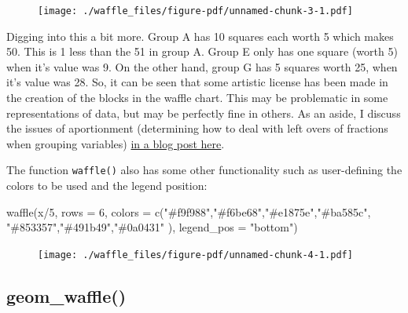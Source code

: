 \documentclass[
  letterpaper,
  DIV=11,
  numbers=noendperiod]{scrreprt}
\newenvironment{Shaded}{\begin{snugshade}}{\end{snugshade}}
\newcommand{\AttributeTok}[1]{\textcolor[rgb]{0.40,0.45,0.13}{#1}}
\newcommand{\DecValTok}[1]{\textcolor[rgb]{0.68,0.00,0.00}{#1}}
\newcommand{\FunctionTok}[1]{\textcolor[rgb]{0.28,0.35,0.67}{#1}}
\newcommand{\NormalTok}[1]{\textcolor[rgb]{0.00,0.23,0.31}{#1}}
\newcommand{\SpecialCharTok}[1]{\textcolor[rgb]{0.37,0.37,0.37}{#1}}
\newcommand{\StringTok}[1]{\textcolor[rgb]{0.13,0.47,0.30}{#1}}
\begin{document}
\begin{figure}[H]

{\centering \texttt{[image: ./waffle\_files/figure-pdf/unnamed-chunk-3-1.pdf]}

}

\end{figure}

Digging into this a bit more. Group A has 10 squares each worth 5 which
makes 50. This is 1 less than the 51 in group A. Group E only has one
square (worth 5) when it's value was 9. On the other hand, group G has 5
squares worth 25, when it's value was 28. So, it can be seen that some
artistic license has been made in the creation of the blocks in the
waffle chart. This may be problematic in some representations of data,
but may be perfectly fine in others. As an aside, I discuss the issues
of aportionment (determining how to deal with left overs of fractions
when grouping variables)
\href{https://jamescurley.blog/posts/2020-10-16-apportionment-methods/}{in
a blog post here}.

The function \texttt{waffle()} also has some other functionality such as
user-defining the colors to be used and the legend position:

\begin{Shaded}
\begin{Highlighting}[]
\FunctionTok{waffle}\NormalTok{(x}\SpecialCharTok{/}\DecValTok{5}\NormalTok{, }\AttributeTok{rows =} \DecValTok{6}\NormalTok{,}
       \AttributeTok{colors =} \FunctionTok{c}\NormalTok{(}\StringTok{"\#f9f988"}\NormalTok{,}\StringTok{"\#f6be68"}\NormalTok{,}\StringTok{"\#e1875e"}\NormalTok{,}\StringTok{"\#ba585c"}\NormalTok{,}
                           \StringTok{"\#853357"}\NormalTok{,}\StringTok{"\#491b49"}\NormalTok{,}\StringTok{"\#0a0431"}
\NormalTok{       ),}
       \AttributeTok{legend\_pos =} \StringTok{"bottom"}\NormalTok{)}
\end{Highlighting}
\end{Shaded}

\begin{figure}[H]

{\centering \texttt{[image: ./waffle\_files/figure-pdf/unnamed-chunk-4-1.pdf]}

}

\end{figure}

\hypertarget{geom_waffle}{%
\subsection{geom\_waffle()}\label{geom_waffle}}
\end{document}
